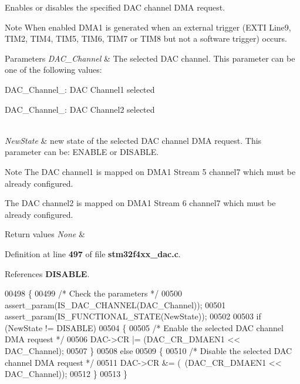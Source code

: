 Enables or disables the specified D\+AC channel D\+MA request. 

\begin{DoxyNote}{Note}
When enabled D\+M\+A1 is generated when an external trigger (E\+X\+TI Line9, T\+I\+M2, T\+I\+M4, T\+I\+M5, T\+I\+M6, T\+I\+M7 or T\+I\+M8 but not a software trigger) occurs. 
\end{DoxyNote}

\begin{DoxyParams}{Parameters}
{\em D\+A\+C\+\_\+\+Channel} & The selected D\+AC channel. This parameter can be one of the following values\+: \begin{DoxyItemize}
\item D\+A\+C\+\_\+\+Channel\+\_\+: D\+AC Channel1 selected \item D\+A\+C\+\_\+\+Channel\+\_\+: D\+AC Channel2 selected \end{DoxyItemize}
\\
\hline
{\em New\+State} & new state of the selected D\+AC channel D\+MA request. This parameter can be\+: E\+N\+A\+B\+LE or D\+I\+S\+A\+B\+LE. \\
\hline
\end{DoxyParams}
\begin{DoxyNote}{Note}
The D\+AC channel1 is mapped on D\+M\+A1 Stream 5 channel7 which must be already configured. 

The D\+AC channel2 is mapped on D\+M\+A1 Stream 6 channel7 which must be already configured. 
\end{DoxyNote}

\begin{DoxyRetVals}{Return values}
{\em None} & \\
\hline
\end{DoxyRetVals}


Definition at line \textbf{ 497} of file \textbf{ stm32f4xx\+\_\+dac.\+c}.



References \textbf{ D\+I\+S\+A\+B\+LE}.


\begin{DoxyCode}
00498 \{
00499   \textcolor{comment}{/* Check the parameters */}
00500   assert_param(IS_DAC_CHANNEL(DAC\_Channel));
00501   assert_param(IS_FUNCTIONAL_STATE(NewState));
00502 
00503   \textcolor{keywordflow}{if} (NewState != DISABLE)
00504   \{
00505     \textcolor{comment}{/* Enable the selected DAC channel DMA request */}
00506     DAC->CR |= (DAC_CR_DMAEN1 << DAC\_Channel);
00507   \}
00508   \textcolor{keywordflow}{else}
00509   \{
00510     \textcolor{comment}{/* Disable the selected DAC channel DMA request */}
00511     DAC->CR &= (~(DAC_CR_DMAEN1 << DAC\_Channel));
00512   \}
00513 \}
\end{DoxyCode}
